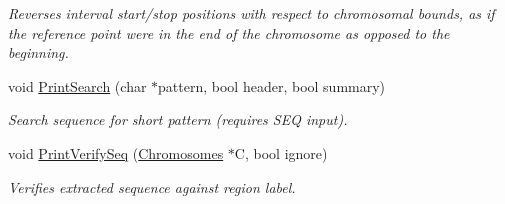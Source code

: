 \begin{CompactItemize}
\begin{CompactList}\small\item\em Reverses interval start/stop positions with respect to chromosomal bounds, as if the reference point were in the end of the chromosome as opposed to the beginning. \item\end{CompactList}\item 
\hypertarget{classGenomicRegionSet_dfbad7f0acf42c2179bd33103e5d183c}{
void \hyperlink{classGenomicRegionSet_dfbad7f0acf42c2179bd33103e5d183c}{PrintSearch} (char $\ast$pattern, bool header, bool summary)}
\label{classGenomicRegionSet_dfbad7f0acf42c2179bd33103e5d183c}

\begin{CompactList}\small\item\em Search sequence for short pattern (requires SEQ input). \item\end{CompactList}\item 
\hypertarget{classGenomicRegionSet_4c197a09ffcace2ec2736aa089eec448}{
void \hyperlink{classGenomicRegionSet_4c197a09ffcace2ec2736aa089eec448}{PrintVerifySeq} (\hyperlink{classChromosomes}{Chromosomes} $\ast$C, bool ignore)}
\label{classGenomicRegionSet_4c197a09ffcace2ec2736aa089eec448}

\begin{CompactList}\small\item\em Verifies extracted sequence against region label. \item\end{CompactList}\end{CompactItemize}
